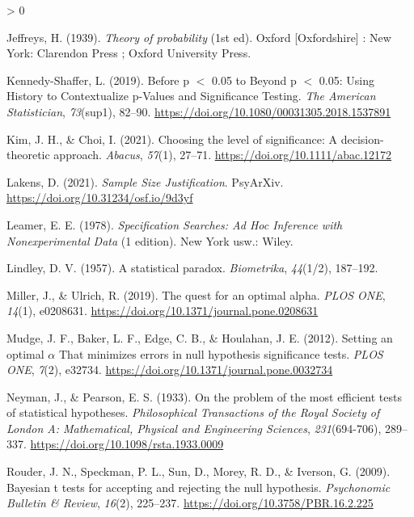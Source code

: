 \documentclass[
  english,
  ,man, a4paper,floatsintext]{apa6}
\newlength{\cslhangindent}
\newenvironment{CSLReferences}[2] %
 {%
  \setlength{\parindent}{0pt}
  \ifodd #1 \everypar{\setlength{\hangindent}{\cslhangindent}}\ignorespaces\fi
  \ifnum #2 > 0
  \setlength{\parskip}{#2\baselineskip}
  \fi
 }%
 {}
\begin{document}
\begin{CSLReferences}{1}{0}
\leavevmode\hypertarget{ref-jeffreys_theory_1939}{}%
Jeffreys, H. (1939). \emph{Theory of probability} (1st ed). {Oxford {[}Oxfordshire{]} : New York}: {Clarendon Press ; Oxford University Press}.

\leavevmode\hypertarget{ref-kennedy-shaffer_before_2019}{}%
Kennedy-Shaffer, L. (2019). Before p {\(<\)} 0.05 to {Beyond} p {\(<\)} 0.05: {Using History} to {Contextualize} p-{Values} and {Significance Testing}. \emph{The American Statistician}, \emph{73}(sup1), 82--90. \url{https://doi.org/10.1080/00031305.2018.1537891}

\leavevmode\hypertarget{ref-kim2021choosing}{}%
Kim, J. H., \& Choi, I. (2021). Choosing the level of significance: A decision-theoretic approach. \emph{Abacus}, \emph{57}(1), 27--71. \url{https://doi.org/10.1111/abac.12172}

\leavevmode\hypertarget{ref-lakens_sample_2021}{}%
Lakens, D. (2021). \emph{Sample {Size} {Justification}}. PsyArXiv. \url{https://doi.org/10.31234/osf.io/9d3yf}

\leavevmode\hypertarget{ref-leamer_specification_1978}{}%
Leamer, E. E. (1978). \emph{Specification {Searches}: {Ad Hoc Inference} with {Nonexperimental Data}} (1 edition). {New York usw.}: {Wiley}.

\leavevmode\hypertarget{ref-lindley_statistical_1957}{}%
Lindley, D. V. (1957). A statistical paradox. \emph{Biometrika}, \emph{44}(1/2), 187--192.

\leavevmode\hypertarget{ref-miller_quest_2019}{}%
Miller, J., \& Ulrich, R. (2019). The quest for an optimal alpha. \emph{PLOS ONE}, \emph{14}(1), e0208631. \url{https://doi.org/10.1371/journal.pone.0208631}

\leavevmode\hypertarget{ref-mudge_setting_2012}{}%
Mudge, J. F., Baker, L. F., Edge, C. B., \& Houlahan, J. E. (2012). Setting an optimal {\(\alpha\)} {That minimizes errors} in {null hypothesis significance tests}. \emph{PLOS ONE}, \emph{7}(2), e32734. \url{https://doi.org/10.1371/journal.pone.0032734}

\leavevmode\hypertarget{ref-neyman_problem_1933}{}%
Neyman, J., \& Pearson, E. S. (1933). On the problem of the most efficient tests of statistical hypotheses. \emph{Philosophical Transactions of the Royal Society of London A: Mathematical, Physical and Engineering Sciences}, \emph{231}(694-706), 289--337. \url{https://doi.org/10.1098/rsta.1933.0009}

\leavevmode\hypertarget{ref-rouder_bayesian_2009}{}%
Rouder, J. N., Speckman, P. L., Sun, D., Morey, R. D., \& Iverson, G. (2009). Bayesian t tests for accepting and rejecting the null hypothesis. \emph{Psychonomic Bulletin \& Review}, \emph{16}(2), 225--237. \url{https://doi.org/10.3758/PBR.16.2.225}


\end{CSLReferences}
\end{document}
